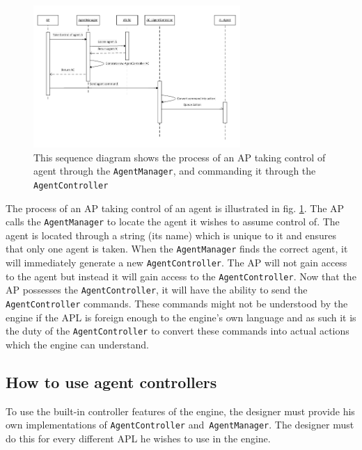 \begin{figure}
\begin{centering}
\includegraphics[width=0.7\textwidth]{SystemFeatureAgentControllerSequenceDiagram}
\par\end{centering}

\caption{This sequence diagram shows the process of an AP taking control of
agent through the \texttt{AgentManager}, and commanding it through
the \texttt{AgentController\label{fig:APConnectingToAndControllingAC}}}
\end{figure}


The process of an AP taking control of an agent is illustrated in
fig. \ref{fig:APConnectingToAndControllingAC}. The AP calls the \texttt{AgentManager}
to locate the agent it wishes to assume control of. The agent is located
through a string (its name) which is unique to it and ensures that
only one agent is taken. When the \texttt{AgentManager} finds the
correct agent, it will immediately generate a new \texttt{AgentController}.
The AP will not gain access to the agent but instead it will gain
access to the \texttt{AgentController}. Now that the AP possesses
the \texttt{AgentController}, it will have the ability to send the
\texttt{AgentController} commands. These commands might not be understood
by the engine if the APL is foreign enough to the engine\textquoteright{}s
own language and as such it is the duty of the \texttt{AgentController}
to convert these commands into actual actions which the engine can
understand.


\subsection{How to use agent controllers}

To use the built-in controller features of the engine, the designer
must provide his own implementations of \texttt{AgentController} and\texttt{
AgentManager}. The designer must do this for every different APL he
wishes to use in the engine.

